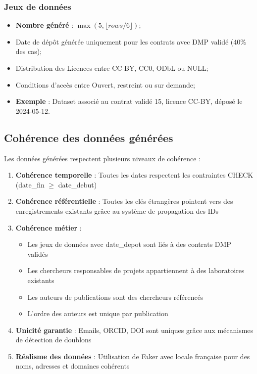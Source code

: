 \documentclass[12pt,a4paper]{article}
\begin{document}
\subsubsection{Jeux de données}
\begin{itemize}
    \item \textbf{Nombre généré} : $\max(5, \lfloor rows/6 \rfloor)$;
    \item Date de dépôt générée uniquement pour les contrats avec DMP validé (40\% des cas);
    \item Distribution des Licences entre CC-BY, CC0, ODbL ou NULL;
    \item Conditions d'accès entre Ouvert, restreint ou sur demande;
    \item \textbf{Exemple} : Dataset associé au contrat validé 15, licence CC-BY, déposé le 2024-05-12.
\end{itemize}

\subsection{Cohérence des données générées}

Les données générées respectent plusieurs niveaux de cohérence :

\begin{enumerate}
    \item \textbf{Cohérence temporelle} : Toutes les dates respectent les contraintes CHECK (date\_fin $\geq$ date\_debut)
    
    \item \textbf{Cohérence référentielle} : Toutes les clés étrangères pointent vers des enregistrements existants grâce au système de propagation des IDs
    
    \item \textbf{Cohérence métier} :
    \begin{itemize}
        \item Les jeux de données avec date\_depot sont liés à des contrats DMP validés
        \item Les chercheurs responsables de projets appartiennent à des laboratoires existants
        \item Les auteurs de publications sont des chercheurs référencés
        \item L'ordre des auteurs est unique par publication
    \end{itemize}
    
    \item \textbf{Unicité garantie} : Emails, ORCID, DOI sont uniques grâce aux mécanismes de détection de doublons
    
    \item \textbf{Réalisme des données} : Utilisation de Faker avec locale française pour des noms, adresses et domaines cohérents
\end{enumerate}
\end{document}

